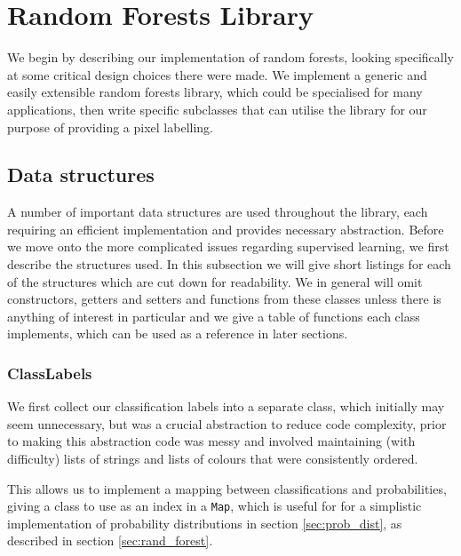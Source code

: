 \documentclass[12pt,twoside,notitlepage]{report}
\begin{document}
    \section{Random Forests Library}
        We begin by describing our implementation of random forests, looking specifically at some critical design 
        choices there were made. We implement a generic and easily extensible random forests library, which could 
        be specialised for many applications, then write specific subclasses that can utilise the library for our 
        purpose of providing a pixel labelling.

        \subsection{Data structures}
            A number of important data structures are used throughout the library, each requiring an efficient 
            implementation and provides necessary abstraction. Before we move onto the more complicated issues 
            regarding supervised learning, we first describe the structures used. In this subsection 
            we will give short listings for each of the structures which are cut down for readability. We 
            in general will omit constructors, getters and setters and functions from these classes unless there is 
            anything of interest in particular and we give a table of functions each class implements, which can 
            be used as a reference in later sections. 



            \subsubsection{ClassLabels}
                We first collect our classification labels into a separate class, which initially may seem unnecessary, 
                but was a crucial abstraction to reduce code complexity, prior to making this abstraction code was 
                messy and involved maintaining (with difficulty) lists of strings and lists of colours that were 
                consistently ordered.

                This allows us to implement a mapping between classifications and probabilities, giving a class to use as 
                an index in a \texttt{Map}, which is useful for for a simplistic implementation of probability 
                distributions in section \ref{sec:prob_dist}, as described in section \ref{sec:rand_forest}. 
\end{document}
